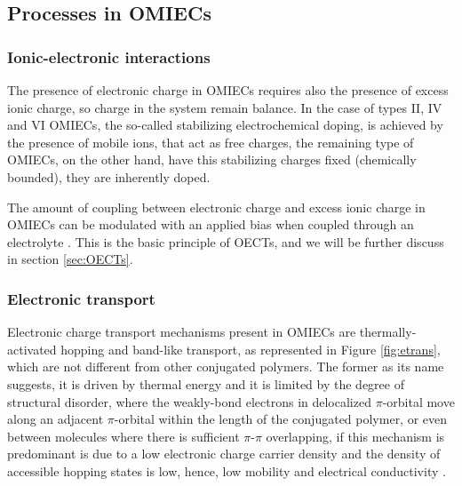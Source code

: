 \subsection{Processes in OMIECs}

\subsubsection{Ionic-electronic interactions}
The presence of electronic charge in OMIECs requires also the presence of excess ionic charge, so charge in the system remain balance. In the case of types II, IV and VI OMIECs, the so-called stabilizing electrochemical doping, is achieved by the presence of mobile ions, that act as free charges, the remaining type of OMIECs, on the other hand, have this stabilizing charges fixed (chemically bounded), they are inherently doped.


The amount of coupling between electronic charge and excess ionic charge in OMIECs can be modulated with an applied bias when coupled through an electrolyte \cite{paulsenOrganicMixedIonic2020}. This is the basic principle of OECTs, and we will be further discuss in section \ref{sec:OECTs}.

\subsubsection{Electronic transport}

Electronic charge transport mechanisms present in OMIECs are thermally-activated hopping and band-like transport, as represented in Figure \ref{fig:etrans}, which are not different from other conjugated polymers. The former as its name suggests, it is driven by thermal energy and it is limited by the degree of structural disorder, where the weakly-bond electrons in delocalized $\pi$-orbital move along an adjacent $\pi$-orbital within the length of the conjugated polymer, or even between molecules where there is sufficient $\pi$-$\pi$ overlapping, if this mechanism is predominant is due to a low electronic charge carrier density and the density of accessible hopping states is low, hence, low mobility and electrical conductivity \cite{paulsenOrganicMixedIonic2020}. 

